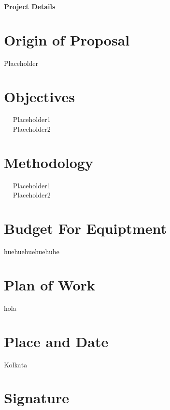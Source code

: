 \documentclass[margin, centered]{res}
\begin{document}
\begin{resume}
\textbf{Project Details}
\section{Origin of Proposal} Placeholder
\section{Objectives}
~\textbullet~ Placeholder1\\
~\textbullet~ Placeholder2

\section{Methodology}
~\textbullet~ Placeholder1\\
~\textbullet~ Placeholder2

\section{Budget For Equiptment} huehuehuehuehuhe

\section{Plan of Work} hola

\section{Place and Date} Kolkata

\section{Signature}

\end{resume}
\end{document}
